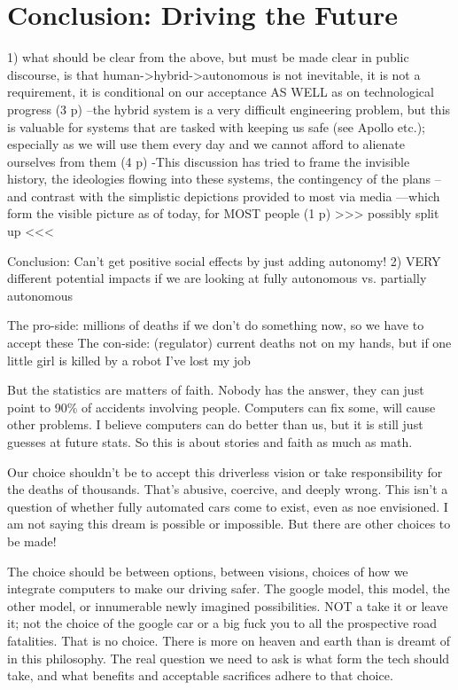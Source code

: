 \chapter{Conclusion: Driving the Future}


1) what should be clear from the above, but must be made clear in
public discourse, is that human->hybrid->autonomous is not inevitable,
it is not a requirement, it is conditional on our acceptance AS WELL
as on technological progress (3 p)
--the hybrid system is a very difficult engineering problem, but this
is valuable for systems that are tasked with keeping us safe (see
Apollo etc.); especially as we will use them every day and we cannot
afford to alienate ourselves from them (4 p)
-This discussion has tried to frame the invisible history, the
ideologies flowing into these systems, the contingency of the plans
--and contrast with the simplistic depictions provided to most via
media
---which form the visible picture as of today, for MOST people (1 p)
>>> possibly split up <<<


Conclusion:
Can't get positive social effects by just adding autonomy!
2) VERY different potential impacts if we are looking at fully
autonomous vs. partially autonomous 

The pro-side: millions of deaths if we don't do something now, so we
have to accept these
The con-side: (regulator) current deaths not on my hands, but if one
little girl is killed by a robot I've lost my job

But the statistics are matters of faith. Nobody has the answer, they
can just point to 90\% of accidents involving people. Computers can fix
                     some, will cause other problems. I believe
                     computers can do better than us, but it is still
                     just guesses at future stats. So this is about
                     stories and faith as much as math.

Our choice shouldn't be to accept this driverless vision or take
responsibility for the deaths of thousands. That's abusive, coercive,
and deeply wrong. This isn't a question of whether fully automated
cars come to exist, even as noe envisioned. I am not saying this dream
is possible or impossible. But there are other choices to be made!

The choice should be between options, between visions, choices of how
we integrate computers to make our driving safer. The google model,
this model, the other model, or innumerable newly imagined
possibilities. NOT a take it or leave it; not the choice of the google
car or a big fuck you to all the prospective road fatalities. That is
no choice. There is more on heaven and earth than is dreamt of in this
philosophy. The real question we need to ask is what form the tech
should take, and what benefits and acceptable sacrifices adhere to
that choice.

